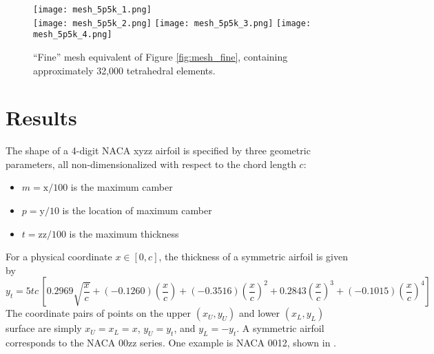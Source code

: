 \documentclass[11pt]{article}
\begin{document}
\begin{figure}[hb]
\begin{center}
\texttt{[image: mesh\_5p5k\_1.png]}
\\[1.5ex]
\texttt{[image: mesh\_5p5k\_2.png]}
\hspace*{1ex}
\texttt{[image: mesh\_5p5k\_3.png]}
\hspace*{1ex}
\texttt{[image: mesh\_5p5k\_4.png]}
\\[1.5ex]
\caption{``Fine'' mesh equivalent of Figure \ref{fig:mesh_fine}, containing approximately 32,000 tetrahedral elements.}
\label{fig:mesh_coarse}
\end{center}
\end{figure}

\section{Results}

The shape of a 4-digit NACA xyzz airfoil is specified by three geometric parameters, all non-dimensionalized with respect to the chord length $c$:
\begin{itemize}
\item $m = \text{x} / 100$ is the maximum camber
\item $p = \text{y} / 10$ is the location of maximum camber
\item $t = \text{zz}/100$ is the maximum thickness
\end{itemize}

For a physical coordinate $x \in [0, c]$, the thickness of a symmetric airfoil is given by
\begin{equation}
y_t = 5tc\, \left[ 0.2969 \sqrt{\frac{x}{c}} + (-0.1260) \left(\frac{x}{c}\right) + (-0.3516) \left(\frac{x}{c}\right)^2 + 0.2843 \left(\frac{x}{c}\right)^3 + (-0.1015) \left( \frac{x}{c} \right)^4 \right]
\end{equation}
The coordinate pairs of points on the upper $(x_U, y_U)$ and lower $(x_L, y_L)$ surface are simply $x_U = x_L = x$, $y_U = y_t$, and $y_L = -y_t$. A symmetric airfoil corresponds to the NACA 00zz series. One example is NACA 0012, shown in .
\end{document}
